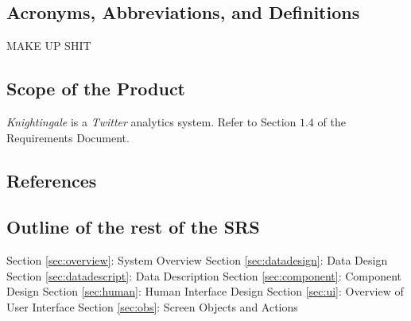 \documentclass[a4paper, 12pt]{article}
\begin{document}
\subsection{Acronyms, Abbreviations, and Definitions} \label{sec:abbr}
\begin{adjustwidth}{2em}{0pt}
MAKE UP SHIT
\end{adjustwidth}

\subsection{Scope of the Product} \label{sec:scope}
\begin{adjustwidth}{2em}{0pt}
\textit{Knightingale} is a \textit{Twitter} analytics system. Refer to Section $1.4$ of the Requirements Document.
\end{adjustwidth}

\subsection{References} \label{sec:ref}
\begin{adjustwidth}{2em}{0pt}

\end{adjustwidth}

\subsection{Outline of the rest of the SRS} \label{sec:outline}
\begin{adjustwidth}{2em}{0pt}
Section \ref{sec:overview}: System Overview \newline
Section \ref{sec:datadesign}: Data Design \newline
Section \ref{sec:datadescript}: Data Description \newline
Section \ref{sec:component}: Component Design \newline
Section \ref{sec:human}: Human Interface Design \newline
Section \ref{sec:ui}: Overview of User Interface \newline
Section \ref{sec:obs}: Screen Objects and Actions \newline
\end{adjustwidth}
\end{document}

